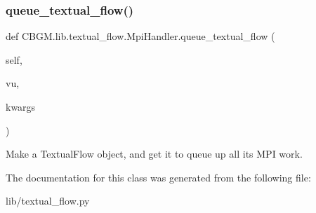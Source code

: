 \subsubsection{\texorpdfstring{queue\+\_\+textual\+\_\+flow()}{queue\_textual\_flow()}}
{\footnotesize\ttfamily def C\+B\+G\+M.\+lib.\+textual\+\_\+flow.\+Mpi\+Handler.\+queue\+\_\+textual\+\_\+flow (\begin{DoxyParamCaption}\item[{}]{self,  }\item[{}]{vu,  }\item[{}]{kwargs }\end{DoxyParamCaption})}

\begin{DoxyVerb}Make a TextualFlow object, and get it to queue up all its MPI work.
\end{DoxyVerb}
 

The documentation for this class was generated from the following file\+:\begin{DoxyCompactItemize}
\item 
lib/textual\+\_\+flow.\+py\end{DoxyCompactItemize}
